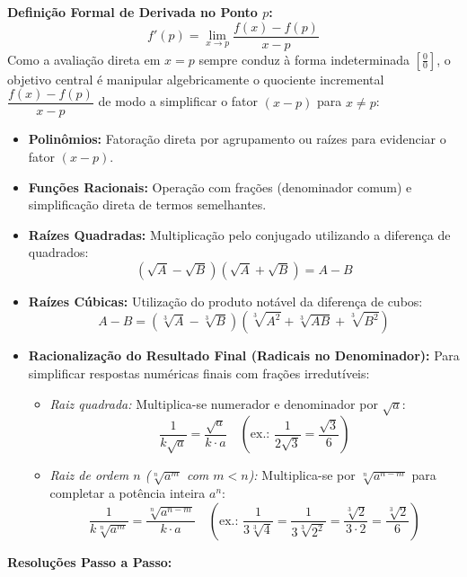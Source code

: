 \begin{recursosbox}[title=Estratégia Geral e Recursos Algébricos]
\textbf{Definição Formal de Derivada no Ponto $p$:}
\[
f'(p) = \lim_{x \to p} \frac{f(x) - f(p)}{x - p}
\]
Como a avaliação direta em $x = p$ sempre conduz à forma indeterminada $\left[\frac{0}{0}\right]$, o objetivo central é manipular algebricamente o quociente incremental $\dfrac{f(x) - f(p)}{x - p}$ de modo a simplificar o fator $(x - p)$ para $x \neq p$:
\begin{itemize}[noitemsep, topsep=2pt]
    \item \textbf{Polinômios:} Fatoração direta por agrupamento ou raízes para evidenciar o fator $(x - p)$.
    \item \textbf{Funções Racionais:} Operação com frações (denominador comum) e simplificação direta de termos semelhantes.
    \item \textbf{Raízes Quadradas:} Multiplicação pelo conjugado utilizando a diferença de quadrados:
    \[
    (\sqrt{A} - \sqrt{B})(\sqrt{A} + \sqrt{B}) = A - B
    \]
    \item \textbf{Raízes Cúbicas:} Utilização do produto notável da diferença de cubos:
    \[
    A - B = (\sqrt[3]{A} - \sqrt[3]{B})\left(\sqrt[3]{A^2} + \sqrt[3]{AB} + \sqrt[3]{B^2}\right)
    \]
    \item \textbf{Racionalização do Resultado Final (Radicais no Denominador):} Para simplificar respostas numéricas finais com frações irredutíveis:
    \begin{itemize}[noitemsep, topsep=1pt]
        \item \textit{Raiz quadrada:} Multiplica-se numerador e denominador por $\sqrt{a}$:
        \[
        \frac{1}{k\sqrt{a}} = \frac{\sqrt{a}}{k \cdot a} \quad \left(\text{ex.: } \frac{1}{2\sqrt{3}} = \frac{\sqrt{3}}{6}\right)
        \]
        \item \textit{Raiz de ordem $n$ ($\sqrt[n]{a^m}$ com $m < n$):} Multiplica-se por $\sqrt[n]{a^{n - m}}$ para completar a potência inteira $a^n$:
        \[
        \frac{1}{k\sqrt[n]{a^m}} = \frac{\sqrt[n]{a^{n - m}}}{k \cdot a} \quad \left(\text{ex.: } \frac{1}{3\sqrt[3]{4}} = \frac{1}{3\sqrt[3]{2^2}} = \frac{\sqrt[3]{2}}{3 \cdot 2} = \frac{\sqrt[3]{2}}{6}\right)
        \]
    \end{itemize}
\end{itemize}
\end{recursosbox}

\vspace{0.4cm}
\textbf{Resoluções Passo a Passo:}


